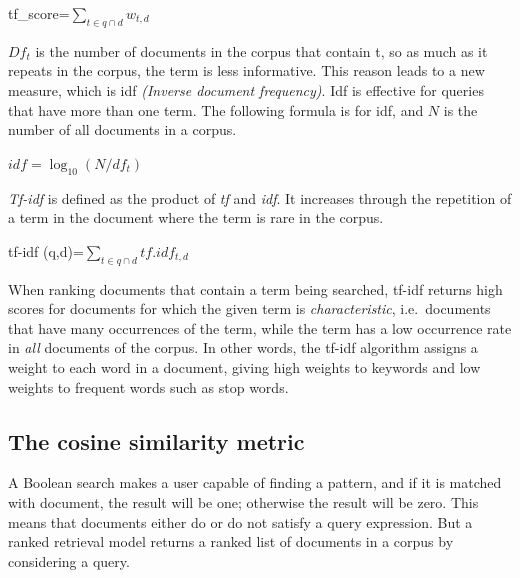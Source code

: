 \documentclass{IOS-Book-Article}
\begin{document}
\begin{center}
	tf\_score=$\sum_{t\in q\cap d} w_{t,d}$
\end{center}

$Df_t$ is the number of documents in the corpus that contain t, so as much as it repeats in the corpus, the term is less informative. This reason leads to a new measure, which is idf \emph{(Inverse document frequency)}. Idf is effective for queries that have more than one term. The following formula is for idf, and $N$ is the number of all documents in a corpus.

\begin{center} 
	$idf=\log_{10} (N/df_t)$
\end{center}

\emph{Tf-idf} is defined as the product of \emph{tf} and \emph{idf}. It increases through the repetition of a term in the document where the term is rare in the corpus.

\begin{center}
	tf-idf (q,d)=$\sum_{t\in q\cap d} \mathit{tf}.idf_{t,d}$
\end{center}

When ranking documents that contain a term being searched, tf-idf returns high scores for documents for which the given term is \emph{characteristic}, i.e.\ documents that have many occurrences of the term, while the term has a low occurrence rate in \emph{all} documents of the corpus. In other words, the tf-idf algorithm assigns a weight to each word in a document, giving high weights to keywords and low weights to frequent words such as stop words.

\subsection{The cosine similarity metric}
\label{sec:cosine}
A Boolean search makes a user capable of finding a pattern, and if it is matched with document, the result will be one; otherwise the result will be zero. This means that documents either do or do not satisfy a query expression. But a ranked retrieval model returns a ranked list of documents in a corpus by considering a query. 
\end{document}
